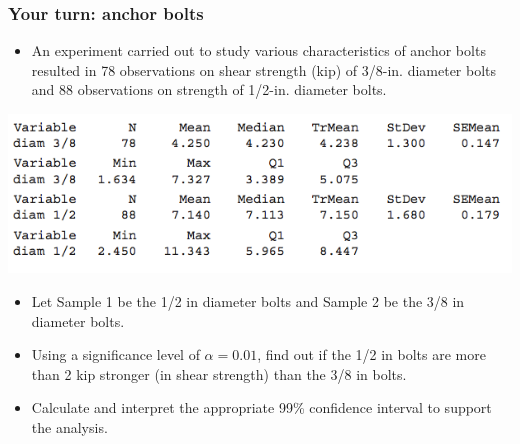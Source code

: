 \documentclass[handout]{beamer}\usepackage[]{graphicx}\usepackage[]{color}
\numberwithin{equation}{section}
\begin{document}
\begin{frame}
\frametitle{Your turn: anchor bolts} \scriptsize
\begin{itemize}
\item An experiment carried out to study various characteristics of anchor bolts resulted in 78 observations on shear strength (kip) of 3/8-in. diameter bolts and 88 observations on strength of 1/2-in. diameter bolts.
\end{itemize}
\begin{center}
 \includegraphics{../../fig/anchorboltsminitab.png}
\end{center}
\begin{itemize}
\pause \item Let Sample 1 be the 1/2 in diameter bolts and Sample 2 be the 3/8 in diameter bolts.
\pause \item Using a significance level of $\alpha = 0.01$, find out if the 1/2 in bolts are more than 2 kip stronger (in shear strength) than the 3/8 in bolts. 
\pause \item Calculate and interpret the appropriate 99\% confidence interval to support the analysis.
\end{itemize}
\end{frame}
\end{document}
